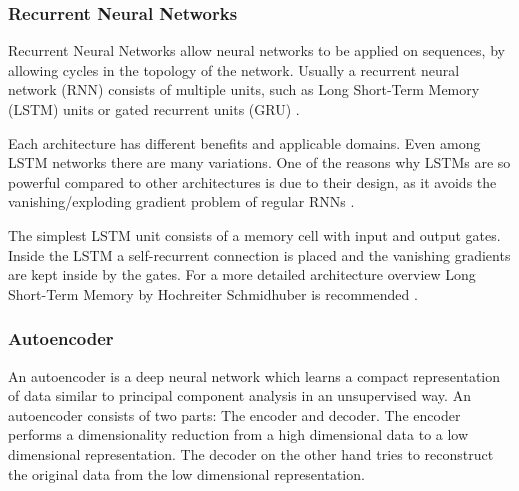 \documentclass[draft,final,oneside]{vutinfth} %
\begin{document}

\subsubsection{Recurrent Neural Networks}
Recurrent Neural Networks allow neural networks to be applied on sequences, by allowing cycles in the topology of the network. Usually a recurrent neural network (RNN) consists of multiple units, such as Long Short-Term Memory (LSTM) units or gated recurrent units (GRU) \cite{gru}.

Each architecture has different benefits and applicable domains. Even among LSTM networks there are many variations. One of the reasons why LSTMs are so powerful compared to other architectures is due to their design, as it avoids the vanishing/exploding gradient problem of regular RNNs \cite {vanishinggradient}.

The simplest LSTM unit consists of a memory cell with input and output gates. Inside the LSTM a self-recurrent connection is placed and the vanishing gradients are kept inside by the gates. For a more detailed architecture overview Long Short-Term Memory by Hochreiter Schmidhuber is recommended \cite{hochreiter}.


\subsubsection{Autoencoder}

An autoencoder is a deep neural network which learns a compact representation of data similar to principal component analysis in an unsupervised way. An autoencoder consists of two parts: The encoder and decoder. The encoder performs a dimensionality reduction from a high dimensional data to a low dimensional representation. The decoder on the other hand tries to reconstruct the original data from the low dimensional representation.





\end{document}
